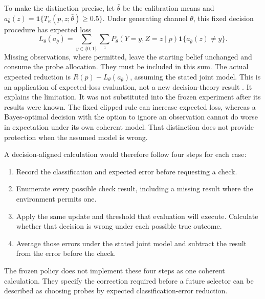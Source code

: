 To make the distinction precise, let $\bar\theta$ be the calibration means and
$a_{\bar\theta}(z)=\mathbf{1}\{T_\kappa(p,z;\bar\theta)\geq 0.5\}$. Under generating channel $\theta$, this fixed decision
procedure has expected loss
\begin{equation}
 L_\theta(a_{\bar\theta})=
 \sum_{y\in\{0,1\}}\sum_z P_\theta(Y=y,Z=z\mid p)
 \mathbf{1}\{a_{\bar\theta}(z)\ne y\}.
\end{equation}
Missing observations, where permitted, leave the starting belief unchanged and consume the probe allocation. They must be
included in this sum. The actual expected reduction is $R(p)-L_\theta(a_{\bar\theta})$, assuming the stated joint model.
This is an application of expected-loss evaluation, not a new decision-theory result
\parencite[Section~5.7]{murphy2012machine}. It explains the limitation. It was not substituted into the frozen experiment after
its results were known. The fixed clipped rule can increase expected loss, whereas a Bayes-optimal decision with the option to
ignore an observation cannot do worse in expectation under its own coherent model. That distinction does not provide protection
when the assumed model is wrong.

A decision-aligned calculation would therefore follow four steps for each case:

\begin{enumerate}
  \item Record the classification and expected error before requesting a check.
  \item Enumerate every possible check result, including a missing result where the environment permits one.
  \item Apply the same update and threshold that evaluation will execute. Calculate whether that decision is wrong under
  each possible true outcome.
  \item Average those errors under the stated joint model and subtract the result from the error before the check.
\end{enumerate}

The frozen policy does not implement these four steps as one coherent calculation. They specify the correction required before
a future selector can be described as choosing probes by expected classification-error reduction.

